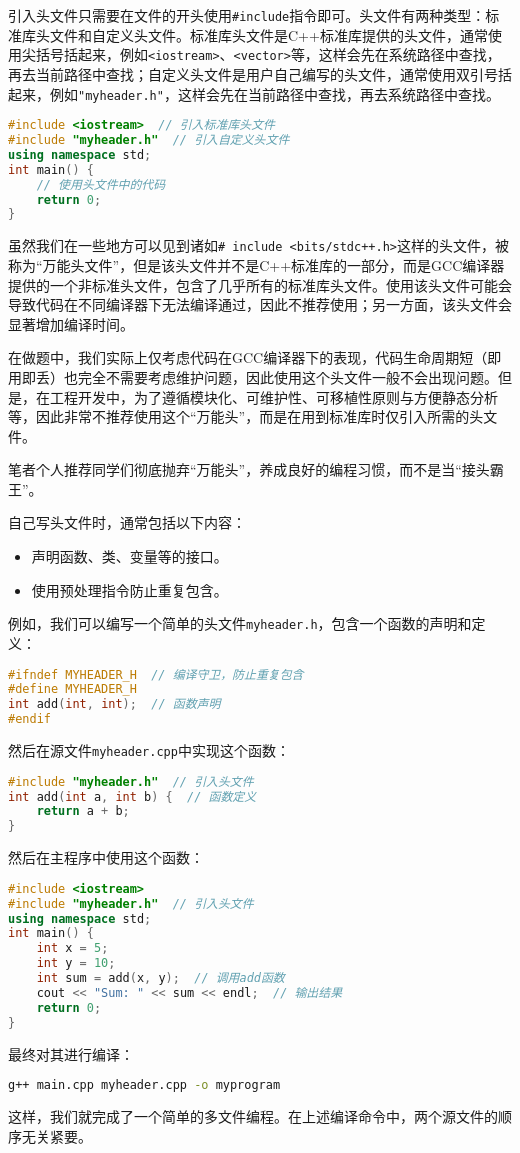 \documentclass[../main.tex]{subfiles}
\begin{document}
引入头文件只需要在文件的开头使用\texttt{\#include}指令即可。头文件有两种类型：标准库头文件和自定义头文件。标准库头文件是C++标准库提供的头文件，通常使用尖括号括起来，例如\texttt{<iostream>}、\texttt{<vector>}等，这样会先在系统路径中查找，再去当前路径中查找；自定义头文件是用户自己编写的头文件，通常使用双引号括起来，例如\texttt{"myheader.h"}，这样会先在当前路径中查找，再去系统路径中查找。

\begin{lstlisting}[language=C++]
#include <iostream>  // 引入标准库头文件
#include "myheader.h"  // 引入自定义头文件
using namespace std;
int main() {
    // 使用头文件中的代码
    return 0;
}
\end{lstlisting}

\begin{caution}
    虽然我们在一些地方可以见到诸如\texttt{\# include <bits/stdc++.h>}这样的头文件，被称为“万能头文件”，但是该头文件并不是C++标准库的一部分，而是GCC编译器提供的一个非标准头文件，包含了几乎所有的标准库头文件。使用该头文件可能会导致代码在不同编译器下无法编译通过，因此不推荐使用；另一方面，该头文件会显著增加编译时间。

    在做题中，我们实际上仅考虑代码在GCC编译器下的表现，代码生命周期短（即用即丢）也完全不需要考虑维护问题，因此使用这个头文件一般不会出现问题。但是，在工程开发中，为了遵循模块化、可维护性、可移植性原则与方便静态分析等，因此非常不推荐使用这个“万能头”，而是在用到标准库时仅引入所需的头文件。

    笔者个人推荐同学们彻底抛弃“万能头”，养成良好的编程习惯，而不是当“接头霸王”。
\end{caution}

自己写头文件时，通常包括以下内容：
\begin{itemize}
  \item 声明函数、类、变量等的接口。
  \item 使用预处理指令防止重复包含。
\end{itemize}
例如，我们可以编写一个简单的头文件\texttt{myheader.h}，包含一个函数的声明和定义：
\begin{lstlisting}[language=C++]
#ifndef MYHEADER_H  // 编译守卫，防止重复包含
#define MYHEADER_H
int add(int, int);  // 函数声明
#endif
\end{lstlisting}
然后在源文件\texttt{myheader.cpp}中实现这个函数：
\begin{lstlisting}[language=C++]
#include "myheader.h"  // 引入头文件
int add(int a, int b) {  // 函数定义
    return a + b;
}
\end{lstlisting}
然后在主程序中使用这个函数：
\begin{lstlisting}[language=C++]
#include <iostream>
#include "myheader.h"  // 引入头文件
using namespace std;
int main() {
    int x = 5;
    int y = 10;
    int sum = add(x, y);  // 调用add函数
    cout << "Sum: " << sum << endl;  // 输出结果
    return 0;
}
\end{lstlisting}
最终对其进行编译：
\begin{lstlisting}[language=bash]
g++ main.cpp myheader.cpp -o myprogram
\end{lstlisting}
这样，我们就完成了一个简单的多文件编程。在上述编译命令中，两个源文件的顺序无关紧要。
\end{document}
